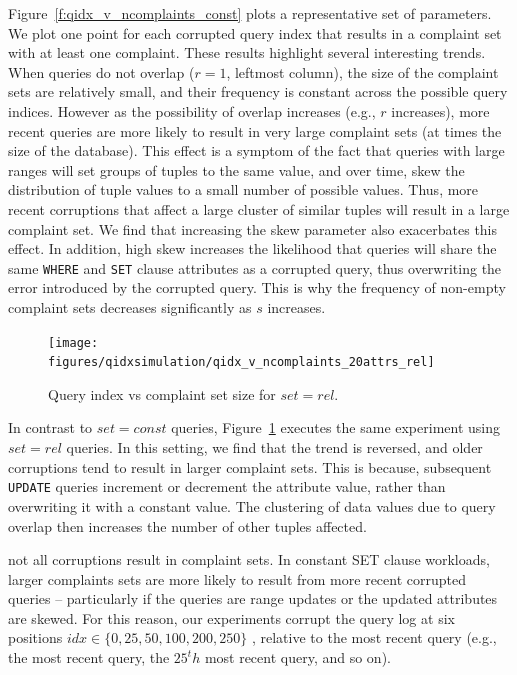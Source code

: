 Figure~\ref{f:qidx_v_ncomplaints_const} plots a representative set of parameters.  We plot one point
for each corrupted query index that results in a complaint set with at least one complaint. 
These results highlight several interesting trends.  When queries do not overlap ($r = 1$, leftmost column),
the size of the complaint sets are relatively small, and their frequency is constant across the possible query indices.
However as the possibility of overlap increases (e.g., $r$ increases), more recent queries are more likely to result in
very large complaint sets (at times the size of the database).   
This effect is a symptom of the fact that queries with large ranges will set groups of tuples to the same value,
and over time, skew the distribution of tuple values to a small number of possible values.
Thus, more recent corruptions that affect a large cluster of similar tuples will result in a large complaint set.
We find that increasing the skew parameter also exacerbates this effect.  
In addition, high skew increases the likelihood that queries will share the same \texttt{WHERE} and \texttt{SET} clause 
attributes as a corrupted query, thus overwriting the error introduced by the corrupted query.  
This is why the frequency of non-empty complaint sets decreases significantly as $s$ increases.


\begin{figure}[h]
\centering
\texttt{[image: figures/qidxsimulation/qidx\_v\_ncomplaints\_20attrs\_rel]}
\caption{Query index vs complaint set size for $set = rel$.}
\label{f:qidx_v_ncomplaints_rel} 
\end{figure}

In contrast to $set=const$ queries, Figure~\ref{f:qidx_v_ncomplaints_rel} executes the 
same experiment using $set=rel$ queries.  In this setting, we find that the trend is
reversed, and older corruptions tend to result in larger complaint sets.  This is because,
subsequent \texttt{UPDATE} queries increment or decrement the attribute value, rather than
overwriting it with a constant value.  The clustering of data values due to query overlap
then increases the number of other tuples affected.


not all corruptions result in complaint sets.
In constant SET clause workloads, larger complaints sets are more likely to
result from more recent corrupted queries -- particularly if the queries are range updates or
the updated attributes are skewed.
For this reason, our experiments corrupt the query log at six positions 
$idx \in \{0, 25, 50, 100, 200, 250\}$ , relative 
to the most recent query (e.g., the most recent query, the $25^th$ most recent query, and so on).



